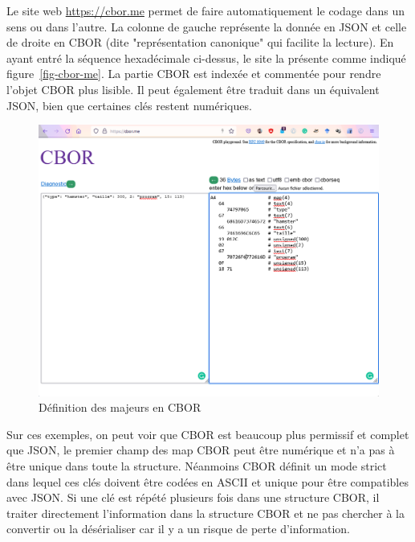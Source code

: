 \begin{figure}
\end{figure}

Le site web \url{https://cbor.me} permet de faire automatiquement le codage dans un sens ou dans l'autre.
La colonne de gauche représente la donnée en JSON et celle de droite en CBOR (dite "représentation canonique" qui facilite la lecture). En ayant entré la séquence hexadécimale ci-dessus, le site la présente comme indiqué figure~\vref{fig-cbor-me}.
La partie CBOR est indexée et commentée pour rendre l'objet CBOR plus lisible. Il peut également être traduit dans un équivalent JSON, bien que certaines clés restent numériques.

\begin{figure}[tbp]
\centerline{\includegraphics[width=1\columnwidth]{Pictures/cbor-me.png}}
\caption{Définition des majeurs en CBOR}
\label{fig-cbor-me}
\end{figure}

Sur ces exemples, on peut voir que CBOR est beaucoup plus permissif et complet que JSON, le premier champ des map CBOR peut être numérique et n'a pas à être unique dans toute la structure. Néanmoins  CBOR
définit un mode strict dans lequel ces clés doivent être codées en ASCII et unique pour être compatibles avec
JSON. Si une clé est répété plusieurs fois dans une structure CBOR, il traiter directement l'information dans la structure CBOR et ne pas chercher à la convertir ou la désérialiser car il y a un risque de perte d'information. 


